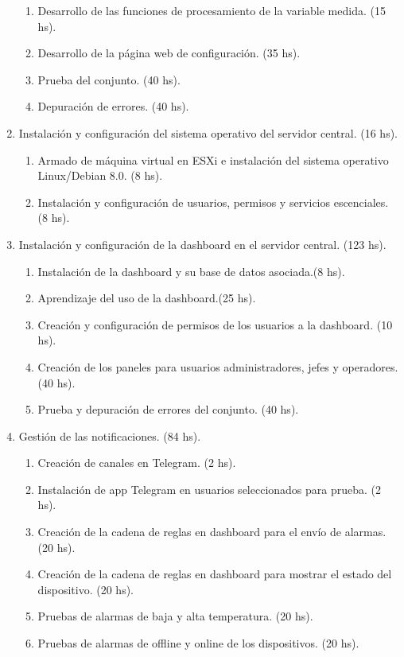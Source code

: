 \documentclass[11pt]{proyecto}
\begin{document}
\begin{enumerate}
\begin{enumerate}
	\item Desarrollo de las funciones de procesamiento de la variable medida. (15 hs).
	\item Desarrollo de la página web de configuración. (35 hs).
	\item Prueba del conjunto. (40 hs).
	\item Depuración de errores. (40 hs).
	\end{enumerate}
\item Instalación y configuración del sistema operativo del servidor central. (16 hs).
	\begin{enumerate}
	\item Armado de máquina virtual en ESXi e instalación del sistema operativo Linux/Debian 8.0.  (8 hs).
	\item Instalación y configuración de usuarios, permisos y servicios escenciales.  (8 hs).
	\end{enumerate}	
	
\item Instalación y configuración de la dashboard en el servidor central.  (123 hs).
	\begin{enumerate}
	\item Instalación de la dashboard y su base de datos asociada.(8 hs).
	\item Aprendizaje del uso de la dashboard.(25 hs).
	\item Creación y configuración de permisos de los usuarios a la dashboard. (10 hs).
	\item Creación de los paneles para usuarios administradores, jefes y operadores. (40 hs).
	\item Prueba y depuración de errores del conjunto. (40 hs).
	\end{enumerate}		
	
\item Gestión de las notificaciones. (84 hs).
	\begin{enumerate}
	\item Creación de canales en Telegram. (2 hs).
	\item Instalación de app Telegram en usuarios seleccionados para prueba. (2 hs).
	\item Creación de la cadena de reglas en dashboard para el envío de alarmas. (20 hs).
	\item Creación de la cadena de reglas en dashboard para mostrar el estado del dispositivo. (20 hs).
	\item Pruebas de alarmas de baja y alta temperatura. (20 hs).
	\item Pruebas de alarmas de offline y online de los dispositivos. (20 hs).
	\end{enumerate}		


\end{enumerate}
\end{document}
